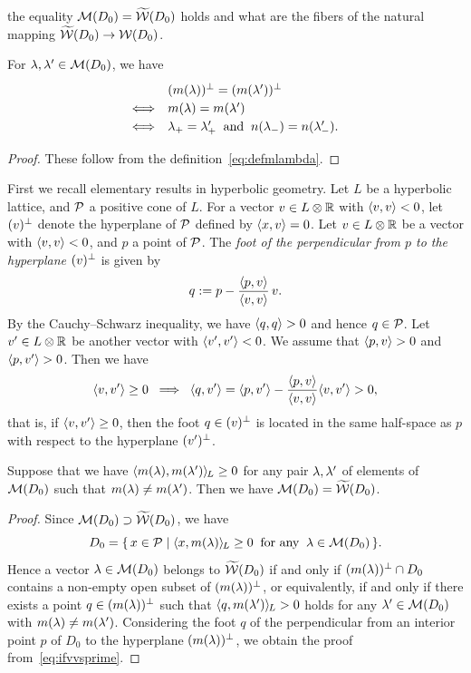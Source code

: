 \documentclass{amsart} %
\begin{document}
the equality $\mathord{\mathcal{M}}(D_0)=\widetilde{\mathord{\mathcal{W}}} (D_0)$ holds and 
what are the fibers of the natural mapping $\widetilde{\mathord{\mathcal{W}}} (D_0)\to \mathord{\mathcal{W}}(D_0)$.
%
\begin{lemma}\label{lem:mmequal}
For $\lambda, \lambda^{\prime}\in \mathord{\mathcal{M}}(D_0)$, we have 
\[
\renewcommand{\arraystretch}{1.2}
\begin{array}{cl}
&(m(\lambda))\sperp=(m(\lambda\sprime))\sperp\\
\Longleftrightarrow & m(\lambda)=m(\lambda\sprime) \\
\Longleftrightarrow & \lambdaplus=\lambdaplus\sprime\;\;\textrm{and}\;\; 
n(\lambdaminus)=n(\lambdaminus\sprime).
\end{array}
\]
\end{lemma}
%
\begin{proof}
These follow from the definition~\eqref{eq:defmlambda}.
\end{proof}
%
%
First we recall elementary results in hyperbolic geometry.
Let $L$ be a hyperbolic lattice, and $\mathord{\mathcal{P}}$ a positive cone of $L$.
For a vector $v\in L\otimes\mathord{\mathbb{R}}$ with $\langle v, v \rangle<0$,
let $(v)^{\perp}$ denote the hyperplane of $\mathord{\mathcal{P}}$ defined by $\langle x, v \rangle=0$.
Let $v\in L\otimes\mathord{\mathbb{R}}$ be a vector with $\langle v, v \rangle<0$, and 
$p$ a point of $\mathord{\mathcal{P}}$.
The \emph{foot of the perpendicular from $p$ to the hyperplane $(v)^{\perp}$ }
is given by
\[
q:=p-\frac{\langle p, v \rangle}{\langle v,v \rangle}\, v.
\]
By the Cauchy--Schwarz inequality,
we have $\langle q, q \rangle>0$
and hence 
$q\in \mathord{\mathcal{P}}$.
Let $v^{\prime}\in L\otimes\mathord{\mathbb{R}}$ be another vector with $\langle v^{\prime}, v^{\prime} \rangle<0$.
We assume that $\langle p, v \rangle>0$ and $\langle p, v^{\prime} \rangle>0$.
Then we have
%
\begin{equation}\label{eq:ifvvsprime}
\langle v, v^{\prime} \rangle\ge 0 \;\;\Longrightarrow \;\; \langle q, v^{\prime} \rangle=
\langle p, v^{\prime} \rangle-\dfrac{\langle p, v \rangle}{\langle v,v \rangle} \langle v, v^{\prime} \rangle>0,
\end{equation}
%
that is, if $\langle v, v^{\prime} \rangle\ge 0$, 
then the foot $q\in (v)^{\perp}$ is located in the same half-space as $p$ with respect to the hyperplane 
$(v^{\prime})^{\perp}$.
%
\begin{lemma}\label{lem:pairsofMMM}
Suppose that we have
$\langle m(\lambda), m(\lambda^{\prime}) \rangle_{\hskip -1pt L}\ge 0$
for any pair $\lambda, \lambda^{\prime}$ of elements of $ \mathord{\mathcal{M}}(D_0)$
such that $m(\lambda)\ne m(\lambda^{\prime})$.
Then we have 
$\mathord{\mathcal{M}}(D_0)=\widetilde{\mathord{\mathcal{W}}} (D_0)$.
\end{lemma}
%
\begin{proof}
Since $\mathord{\mathcal{M}}(D_0)\supset \widetilde{\mathord{\mathcal{W}}} (D_0)$,
 we have 
 \[
 D_0=\{\,{x\in \mathord{\mathcal{P}}}\mid {\langle x, m(\lambda) \rangle_{\hskip -1pt L}\ge 0\;\; \textrm{for any} \;\; \lambda\in \mathord{\mathcal{M}}(D_0)} \,\}.
\]
Hence a vector $\lambda\in \mathord{\mathcal{M}}(D_0)$ belongs to $\widetilde{\mathord{\mathcal{W}}} (D_0)$
if and only if 
$(m(\lambda))^{\perp} \cap D_0$ contains a non-empty open subset of $(m(\lambda))^{\perp} $,
or equivalently,
if and only if 
there exists a point $q\in (m(\lambda))^{\perp}$
such that $\langle q, m(\lambda^{\prime}) \rangle_{\hskip -1pt L}> 0$ holds for any $\lambda^{\prime}\in \mathord{\mathcal{M}}(D_0)$
with $m(\lambda)\ne m(\lambda^{\prime})$.
Considering the foot $q$ of 
the perpendicular from an interior point $p$ of $D_0$
to the hyperplane $(m(\lambda))^{\perp}$,
we obtain the proof from~\eqref{eq:ifvvsprime}.
\end{proof}
\end{document}
